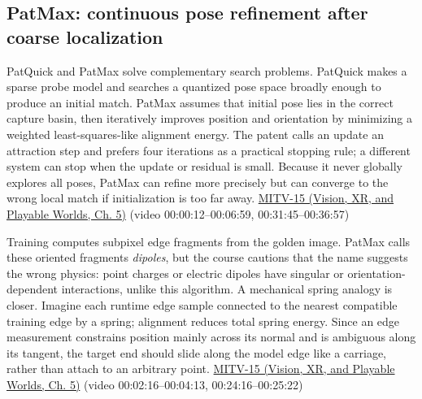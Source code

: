 \subsection{PatMax: continuous pose refinement after coarse localization}\label{04-visual-computing-ii-ch030-patmax-continuous-pose-refinement-after-coarse-localization}

\hypertarget{04-visual-computing-ii-ch030-patmax-continuous-pose-refinement-after-coarse-localization}{}

PatQuick and PatMax solve complementary search problems. PatQuick makes a sparse probe model and searches a quantized pose space broadly enough to produce an initial match. PatMax assumes that initial pose lies in the correct capture basin, then iteratively improves position and orientation by minimizing a weighted least-squares-like alignment energy. The patent calls an update an attraction step and prefers four iterations as a practical stopping rule; a different system can stop when the update or residual is small. Because it never globally explores all poses, PatMax can refine more precisely but can converge to the wrong local match if initialization is too far away. \href{../07-Vision-XR-and-Playable-Worlds/main.pdf\#nameddest=04-visual-computing-ii-ch036-mitv-15---alignment-patmax-distance-field-filtering-and-sub-sampling-us-7065262}{MITV-15 (Vision, XR, and Playable Worlds, Ch. 5)} (video 00:00:12--00:06:59, 00:31:45--00:36:57)

Training computes subpixel edge fragments from the golden image. PatMax calls these oriented fragments \emph{dipoles}, but the course cautions that the name suggests the wrong physics: point charges or electric dipoles have singular or orientation-dependent interactions, unlike this algorithm. A mechanical spring analogy is closer. Imagine each runtime edge sample connected to the nearest compatible training edge by a spring; alignment reduces total spring energy. Since an edge measurement constrains position mainly across its normal and is ambiguous along its tangent, the target end should slide along the model edge like a carriage, rather than attach to an arbitrary point. \href{../07-Vision-XR-and-Playable-Worlds/main.pdf\#nameddest=04-visual-computing-ii-ch036-mitv-15---alignment-patmax-distance-field-filtering-and-sub-sampling-us-7065262}{MITV-15 (Vision, XR, and Playable Worlds, Ch. 5)} (video 00:02:16--00:04:13, 00:24:16--00:25:22)

